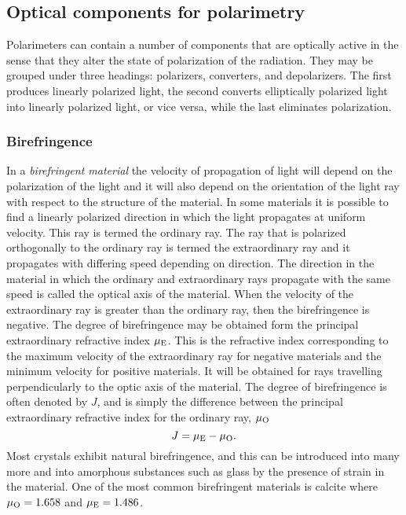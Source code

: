 \subsection{Optical components for polarimetry}

Polarimeters can contain a number of components that are optically active in the sense
that they alter the state of polarization of the radiation. They may be grouped under
three headings: polarizers, converters, and depolarizers. The first produces linearly 
polarized light, the second converts elliptically polarized light into linearly polarized light, or vice versa, while the last eliminates polarization. 

\subsubsection{Birefringence}

In a {\it birefringent material} the velocity of propagation of light will depend on the polarization of the light and it will also depend on the orientation of the light ray 
with respect to the structure of the material. In some materials it is possible to find 
a linearly polarized direction in which the light propagates at uniform velocity. This ray
is termed the ordinary ray. The ray that is polarized orthogonally to the ordinary ray is
termed the extraordinary ray and it propagates with differing speed depending on direction. The direction in the material in which the ordinary and extraordinary rays propagate with the same speed is called the optical axis of the material. When the 
velocity of the extraordinary ray is greater than the ordinary ray, then the birefringence is negative. The degree of birefringence may be obtained form the principal extraordinary 
refractive index $\mu_{\rm E}$. This is the refractive index corresponding to the maximum
velocity of the extraordinary ray for negative materials and the minimum velocity for
positive materials. It will be obtained for rays travelling perpendicularly to the optic axis of the material. The degree of birefringence is often denoted by $J$, and is simply the
difference between the principal extraordinary refractive index for the ordinary ray, $\mu_{\rm O}$
\[
J=\mu_{\rm E}-\mu_{\rm O}.
\]
\noindent
Most crystals exhibit natural birefringence, and this can be introduced into many more
and into amorphous substances such as glass by the presence of strain in the material. One of the most common birefringent materials is calcite where $\mu_{\rm O}=1.658$ and $\mu_{\rm E}=1.486$.


